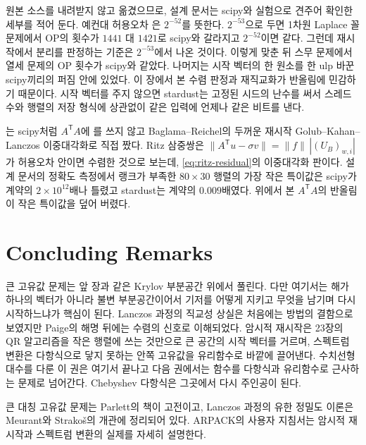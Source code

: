 \begin{instardust}
원본 소스를 내려받지 않고 옮겼으므로, 설계 문서는 scipy와 실험으로 견주어 확인한 세부를 적어 둔다. 예컨대 허용오차 은 $2^{-52}$를 뜻한다. $2^{-53}$으로 두면 1차원 Laplace 꼴 문제에서 OP의 횟수가 $1441$ 대 $1421$로 scipy와 갈라지고 $2^{-52}$이면 같다. 그런데 재시작에서 분리를 판정하는 기준은 $2^{-53}$에서 나온 것이다. 이렇게 맞춘 뒤 스무 문제에서 열세 문제의 OP 횟수가 scipy와 같았다. 나머지는 시작 벡터의 한 원소를 한 ulp 바꾼 scipy끼리의 퍼짐 안에 있었다. 이 장에서 본 수렴 판정과 재직교화가 반올림에 민감하기 때문이다. 시작 벡터를 주지 않으면 stardust는 고정된 시드의 난수를 써서 스레드 수와 행렬의 저장 형식에 상관없이 같은 입력에 언제나 같은 비트를 낸다.
\end{instardust}

\begin{instardust}
는 scipy처럼 $A^{\mathsf T}A$에 를 쓰지 않고 Baglama--Reichel의 두꺼운 재시작 Golub--Kahan--Lanczos 이중대각화로 직접 짰다. Ritz 삼중쌍은 $\|A^{\mathsf T}u-\sigma v\|=\|f\|\,|(U_B)_{w,i}|$가 허용오차 안이면 수렴한 것으로 보는데, \eqref{eq:ritz-residual}의 이중대각화 판이다. 설계 문서의 정확도 측정에서 랭크가 부족한 $80\times30$ 행렬의 가장 작은 특이값은 scipy가 계약의 $2\times10^{12}$배나 틀렸고 stardust는 계약의 $0.009$배였다. 위에서 본 $A^{\mathsf T}A$의 반올림이 작은 특이값을 덮어 버렸다.
\end{instardust}

\section{Concluding Remarks}

큰 고유값 문제는 앞 장과 같은 Krylov 부분공간 위에서 풀린다. 다만 여기서는 해가 하나의 벡터가 아니라 불변 부분공간이어서 기저를 어떻게 지키고 무엇을 남기며 다시 시작하느냐가 핵심이 된다. Lanczos 과정의 직교성 상실은 처음에는 방법의 결함으로 보였지만 Paige의 해명 뒤에는 수렴의 신호로 이해되었다. 암시적 재시작은 23장의 QR 알고리즘을 작은 행렬에 쓰는 것만으로 큰 공간의 시작 벡터를 거르며, 스펙트럼 변환은 다항식으로 닿지 못하는 안쪽 고유값을 유리함수로 바깥에 끌어낸다. 수치선형대수를 다룬 이 권은 여기서 끝나고 다음 권에서는 함수를 다항식과 유리함수로 근사하는 문제로 넘어간다. Chebyshev 다항식은 그곳에서 다시 주인공이 된다.

큰 대칭 고유값 문제는 Parlett의 책\cite{parlett1998}이 고전이고, Lanczos 과정의 유한 정밀도 이론은 Meurant와 Strakoš의 개관\cite{meurant2006}에 정리되어 있다. ARPACK의 사용자 지침서\cite{lehoucq1998arpack}는 암시적 재시작과 스펙트럼 변환의 실제를 자세히 설명한다.

\chapterreferences

